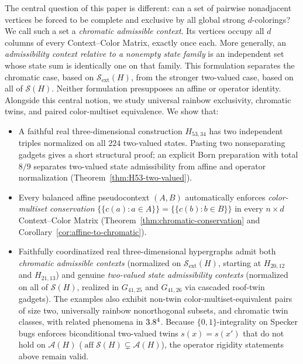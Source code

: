 \documentclass[aps,pra,reprint,superscriptaddress,longbibliography,nofootinbib,floatfix,10pt]{revtex4-2}
\theoremstyle{definition}\newtheorem{definition}[theorem]{Definition}
\theoremstyle{remark}\newtheorem{remark}[theorem]{Remark}
\newcommand{\Sc}{\mathcal S}\newcommand{\Cc}{\mathcal C}\newcommand{\Wc}{\mathcal W}
\begin{document}
The central question of this paper is different: can a set of pairwise nonadjacent vertices be forced to be complete and exclusive by all global strong $d$-colorings? We call such a set a \emph{chromatic admissible context}. Its vertices occupy all $d$ columns of every Context--Color Matrix, exactly once each. More generally, an \emph{admissibility context relative to a nonempty state family} is an independent set whose state sum is identically one on that family. This formulation separates the chromatic case, based on $\Sc_{\mathrm{ext}}(H)$, from the stronger two-valued case, based on all of $\Sc(H)$. Neither formulation presupposes an affine or operator identity. Alongside this central notion, we study universal rainbow exclusivity, chromatic twins, and paired color-multiset equivalence. We show that:
\begin{itemize}
\item A faithful real three-dimensional construction $H_{53,34}$ has two independent triples normalized on all $224$ two-valued states. Pasting two nonseparating gadgets gives a short structural proof; an explicit Born preparation with total $8/9$ separates two-valued state admissibility from affine and operator normalization (Theorem~\ref{thm:H53-two-valued}).
\item Every balanced affine pseudocontext $(A,B)$ automatically enforces \emph{color-multiset conservation} $\{\!\{c(a):a\in A\}\!\}=\{\!\{c(b):b\in B\}\!\}$ in every $n\times d$ Context--Color Matrix (Theorem~\ref{thm:chromatic-conservation} and Corollary~\ref{cor:affine-to-chromatic}).
\item Faithfully coordinatized real three-dimensional hypergraphs admit both \emph{chromatic admissible contexts} (normalized on $\Sc_{\mathrm{ext}}(H)$, starting at $H_{20,12}$ and $H_{21,13}$) and genuine \emph{two-valued state admissibility contexts} (normalized on all of $\Sc(H)$, realized in $G_{41,25}$ and $G_{41,26}$ via cascaded roof-twin gadgets). The examples also exhibit non-twin color-multiset-equivalent pairs of size two, universally rainbow nonorthogonal subsets, and chromatic twin classes, with related phenomena in $3.8^4$. Because $\{0,1\}$-integrality on Specker bugs enforces biconditional two-valued twins $s(x)=s(x')$ that do not hold on $\mathcal A(H)$ ($\operatorname{aff}\Sc(H)\subsetneq\mathcal A(H)$), the operator rigidity statements above remain valid.
\end{itemize}
\end{document}
